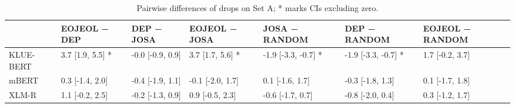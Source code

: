\begin{table}
\caption{Pairwise differences of drops on Set A; * marks CIs excluding zero.}
\label{tab:table3_pairs_setA}
\begin{tabular}{lllllll}
\toprule
 & EOJEOL − DEP & DEP − JOSA & EOJEOL − JOSA & JOSA − RANDOM & DEP − RANDOM & EOJEOL − RANDOM \\
\midrule
KLUE-BERT & 3.7 [1.9, 5.5] * & -0.0 [-0.9, 0.9] & 3.7 [1.7, 5.6] * & -1.9 [-3.3, -0.7] * & -1.9 [-3.3, -0.7] * & 1.7 [-0.2, 3.7] \\
mBERT & 0.3 [-1.4, 2.0] & -0.4 [-1.9, 1.1] & -0.1 [-2.0, 1.7] & 0.1 [-1.6, 1.7] & -0.3 [-1.8, 1.3] & 0.1 [-1.7, 1.8] \\
XLM-R & 1.1 [-0.2, 2.5] & -0.2 [-1.3, 0.9] & 0.9 [-0.5, 2.3] & -0.6 [-1.7, 0.7] & -0.8 [-2.0, 0.4] & 0.3 [-1.2, 1.7] \\
\bottomrule
\end{tabular}
\end{table}
